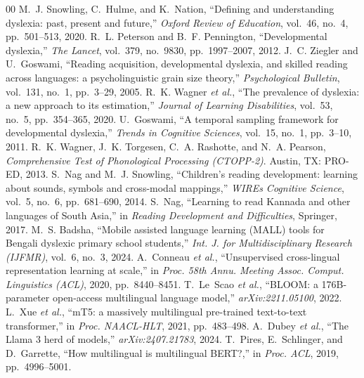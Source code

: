\documentclass[conference]{IEEEtran}
\begin{document}
\begin{thebibliography}{00}
 M.~J. Snowling, C.~Hulme, and K.~Nation, ``Defining and understanding dyslexia: past, present and future,'' \emph{Oxford Review of Education}, vol.~46, no.~4, pp.~501--513, 2020.
 R.~L. Peterson and B.~F. Pennington, ``Developmental dyslexia,'' \emph{The Lancet}, vol.~379, no.~9830, pp.~1997--2007, 2012.
 J.~C. Ziegler and U.~Goswami, ``Reading acquisition, developmental dyslexia, and skilled reading across languages: a psycholinguistic grain size theory,'' \emph{Psychological Bulletin}, vol.~131, no.~1, pp.~3--29, 2005.
 R.~K. Wagner \emph{et al.}, ``The prevalence of dyslexia: a new approach to its estimation,'' \emph{Journal of Learning Disabilities}, vol.~53, no.~5, pp.~354--365, 2020.
 U.~Goswami, ``A temporal sampling framework for developmental dyslexia,'' \emph{Trends in Cognitive Sciences}, vol.~15, no.~1, pp.~3--10, 2011.
 R.~K. Wagner, J.~K. Torgesen, C.~A. Rashotte, and N.~A. Pearson, \emph{Comprehensive Test of Phonological Processing (CTOPP-2)}. Austin, TX: PRO-ED, 2013.
 S.~Nag and M.~J. Snowling, ``Children's reading development: learning about sounds, symbols and cross-modal mappings,'' \emph{WIREs Cognitive Science}, vol.~5, no.~6, pp.~681--690, 2014.
 S.~Nag, ``Learning to read Kannada and other languages of South Asia,'' in \emph{Reading Development and Difficulties}, Springer, 2017.
 M.~S. Badsha, ``Mobile assisted language learning (MALL) tools for Bengali dyslexic primary school students,'' \emph{Int. J. for Multidisciplinary Research (IJFMR)}, vol.~6, no.~3, 2024.
 A.~Conneau \emph{et al.}, ``Unsupervised cross-lingual representation learning at scale,'' in \emph{Proc. 58th Annu. Meeting Assoc. Comput. Linguistics (ACL)}, 2020, pp.~8440--8451.
 T.~Le~Scao \emph{et al.}, ``BLOOM: a 176B-parameter open-access multilingual language model,'' \emph{arXiv:2211.05100}, 2022.
 L.~Xue \emph{et al.}, ``mT5: a massively multilingual pre-trained text-to-text transformer,'' in \emph{Proc. NAACL-HLT}, 2021, pp.~483--498.
 A.~Dubey \emph{et al.}, ``The Llama 3 herd of models,'' \emph{arXiv:2407.21783}, 2024.
 T.~Pires, E.~Schlinger, and D.~Garrette, ``How multilingual is multilingual BERT?,'' in \emph{Proc. ACL}, 2019, pp.~4996--5001.

\end{thebibliography}
\end{document}
